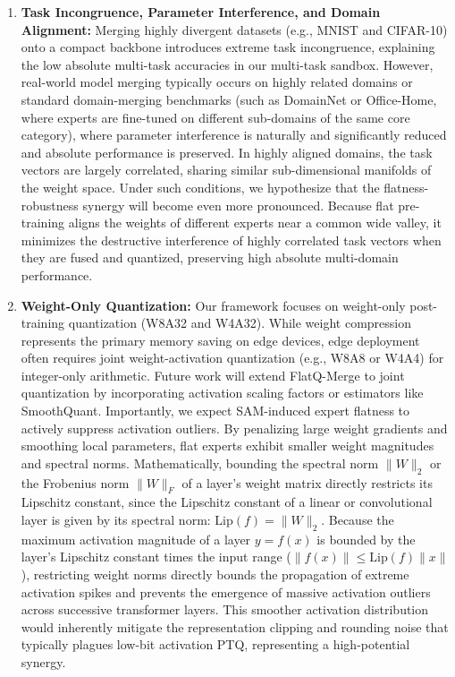 \begin{enumerate}
  \item \textbf{Task Incongruence, Parameter Interference, and Domain Alignment:} Merging highly divergent datasets (e.g., MNIST and CIFAR-10) onto a compact backbone introduces extreme task incongruence, explaining the low absolute multi-task accuracies in our multi-task sandbox. However, real-world model merging typically occurs on highly related domains or standard domain-merging benchmarks (such as DomainNet or Office-Home, where experts are fine-tuned on different sub-domains of the same core category), where parameter interference is naturally and significantly reduced and absolute performance is preserved. In highly aligned domains, the task vectors are largely correlated, sharing similar sub-dimensional manifolds of the weight space. Under such conditions, we hypothesize that the flatness-robustness synergy will become even more pronounced. Because flat pre-training aligns the weights of different experts near a common wide valley, it minimizes the destructive interference of highly correlated task vectors when they are fused and quantized, preserving high absolute multi-domain performance.
  \item \textbf{Weight-Only Quantization:} Our framework focuses on weight-only post-training quantization (W8A32 and W4A32). While weight compression represents the primary memory saving on edge devices, edge deployment often requires joint weight-activation quantization (e.g., W8A8 or W4A4) for integer-only arithmetic. Future work will extend FlatQ-Merge to joint quantization by incorporating activation scaling factors or estimators like SmoothQuant. Importantly, we expect SAM-induced expert flatness to actively suppress activation outliers. By penalizing large weight gradients and smoothing local parameters, flat experts exhibit smaller weight magnitudes and spectral norms. Mathematically, bounding the spectral norm $\|W\|_2$ or the Frobenius norm $\|W\|_F$ of a layer's weight matrix directly restricts its Lipschitz constant, since the Lipschitz constant of a linear or convolutional layer is given by its spectral norm: $\text{Lip}(f) = \|W\|_2$. Because the maximum activation magnitude of a layer $y = f(x)$ is bounded by the layer's Lipschitz constant times the input range ($\|f(x)\| \le \text{Lip}(f) \|x\|$), restricting weight norms directly bounds the propagation of extreme activation spikes and prevents the emergence of massive activation outliers across successive transformer layers. This smoother activation distribution would inherently mitigate the representation clipping and rounding noise that typically plagues low-bit activation PTQ, representing a high-potential synergy.

\end{enumerate}
